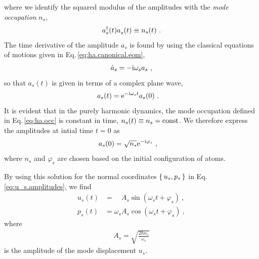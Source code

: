where we identify the squared modulus of the amplitudes with the \emph{mode occupation} $n_s$,
\begin{align}
	\D a_s (t) \fD a_s (t) \equiv n_s (t)~.
	\label{eq:ha.occ}
\end{align}
The time derivative of the amplitude $a_s$ is found by using the classical equations of motions given in Eq.\,\eqref{eq:ha.canonical.eom},
\begin{align}
	\dot a_s
		= - \im \omega_s a_s~,
	\label{eq:dot_a_s}
\end{align}
so that $a_s (t)$ is given in terms of a complex plane wave,
	\begin{align}
		a_s (t) 
			& = {\rm e}^{- \im \omega_s t} a_s (0)~.
			\label{eq:a_s(t)}
	\end{align}
It is evident that in the purely harmonic dynamics, the mode occupation defined in Eq.\,\eqref{eq:ha.occ} is constant in time, $n_s (t) \equiv n_s = {\rm const}$. We therefore express the amplitudes at intial time $t=0$ as
\begin{align}
	a_s (0)
		& = \sqrt{n_s} {\rm e}^{- {\rm i} \varphi_s}~,
\end{align}
where $n_s$ and $\varphi_s$ are chosen based on the initial configuration of atoms.


By using this solution for the normal coordinates $\set{u_s, p_s}$ in Eq.\,\eqref{eq:u_s.amplitudes}, we find
\begin{subequations}
	\label{eq:u_p_st}
	\begin{align}
	u_s (t) 
	&= \phantom{\omega_s} A_s \sin (\omega_s t + \varphi_s)~,
	\label{eq:u_s(t)}
	\\
	p_s (t) 
	&= \omega_s A_s \cos (\omega_s t + \varphi_s)~,
	\end{align}
\end{subequations}
where 
\begin{align}
	A_s = \sqrt{\frac{2 \hbar n_s}{\omega_s}}
\end{align}
is the amplitude of the mode displacement $u_s$.

